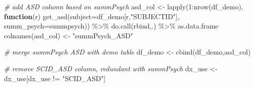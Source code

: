 \documentclass[
]{article}
\newenvironment{Shaded}{\begin{snugshade}}{\end{snugshade}}
\newcommand{\AttributeTok}[1]{\textcolor[rgb]{0.77,0.63,0.00}{#1}}
\newcommand{\CommentTok}[1]{\textcolor[rgb]{0.56,0.35,0.01}{\textit{#1}}}
\newcommand{\ControlFlowTok}[1]{\textcolor[rgb]{0.13,0.29,0.53}{\textbf{#1}}}
\newcommand{\DecValTok}[1]{\textcolor[rgb]{0.00,0.00,0.81}{#1}}
\newcommand{\FunctionTok}[1]{\textcolor[rgb]{0.00,0.00,0.00}{#1}}
\newcommand{\NormalTok}[1]{#1}
\newcommand{\OtherTok}[1]{\textcolor[rgb]{0.56,0.35,0.01}{#1}}
\newcommand{\SpecialCharTok}[1]{\textcolor[rgb]{0.00,0.00,0.00}{#1}}
\newcommand{\StringTok}[1]{\textcolor[rgb]{0.31,0.60,0.02}{#1}}
\begin{document}
\begin{Shaded}
\begin{Highlighting}[]
\CommentTok{\# add ASD column based on summPsych}
\NormalTok{asd\_col }\OtherTok{\textless{}{-}} \FunctionTok{lapply}\NormalTok{(}\DecValTok{1}\SpecialCharTok{:}\FunctionTok{nrow}\NormalTok{(df\_demo), }\ControlFlowTok{function}\NormalTok{(r) }\FunctionTok{get\_asd}\NormalTok{(}\AttributeTok{subject=}\NormalTok{df\_demo[r,}\StringTok{"SUBJECTID"}\NormalTok{], }\AttributeTok{summ\_psych=}\NormalTok{summpsych)) }\SpecialCharTok{\%\textgreater{}\%} \FunctionTok{do.call}\NormalTok{(rbind,.) }\SpecialCharTok{\%\textgreater{}\%}\NormalTok{ as.data.frame}
\FunctionTok{colnames}\NormalTok{(asd\_col) }\OtherTok{\textless{}{-}} \StringTok{"summPsych\_ASD"}

\CommentTok{\# merge summPsych ASD with demo table}
\NormalTok{df\_demo }\OtherTok{\textless{}{-}} \FunctionTok{cbind}\NormalTok{(df\_demo,asd\_col)}

\CommentTok{\# remove SCID\_ASD column, redundant with summPsych}
\NormalTok{dx\_use }\OtherTok{\textless{}{-}}\NormalTok{ dx\_use[dx\_use }\SpecialCharTok{!=} \StringTok{"SCID\_ASD"}\NormalTok{]}


\end{Highlighting}
\end{Shaded}
\end{document}
